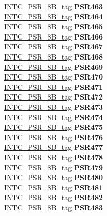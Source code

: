 \begin{DoxyCompactItemize}
\begin{tabbing}
\>\>\mbox{\hyperlink{unionINTC__PSR__8B__tag}{INTC\_PSR\_8B\_tag}} {\bfseries PSR463}\\
\>\>\mbox{\hyperlink{unionINTC__PSR__8B__tag}{INTC\_PSR\_8B\_tag}} {\bfseries PSR464}\\
\>\>\mbox{\hyperlink{unionINTC__PSR__8B__tag}{INTC\_PSR\_8B\_tag}} {\bfseries PSR465}\\
\>\>\mbox{\hyperlink{unionINTC__PSR__8B__tag}{INTC\_PSR\_8B\_tag}} {\bfseries PSR466}\\
\>\>\mbox{\hyperlink{unionINTC__PSR__8B__tag}{INTC\_PSR\_8B\_tag}} {\bfseries PSR467}\\
\>\>\mbox{\hyperlink{unionINTC__PSR__8B__tag}{INTC\_PSR\_8B\_tag}} {\bfseries PSR468}\\
\>\>\mbox{\hyperlink{unionINTC__PSR__8B__tag}{INTC\_PSR\_8B\_tag}} {\bfseries PSR469}\\
\>\>\mbox{\hyperlink{unionINTC__PSR__8B__tag}{INTC\_PSR\_8B\_tag}} {\bfseries PSR470}\\
\>\>\mbox{\hyperlink{unionINTC__PSR__8B__tag}{INTC\_PSR\_8B\_tag}} {\bfseries PSR471}\\
\>\>\mbox{\hyperlink{unionINTC__PSR__8B__tag}{INTC\_PSR\_8B\_tag}} {\bfseries PSR472}\\
\>\>\mbox{\hyperlink{unionINTC__PSR__8B__tag}{INTC\_PSR\_8B\_tag}} {\bfseries PSR473}\\
\>\>\mbox{\hyperlink{unionINTC__PSR__8B__tag}{INTC\_PSR\_8B\_tag}} {\bfseries PSR474}\\
\>\>\mbox{\hyperlink{unionINTC__PSR__8B__tag}{INTC\_PSR\_8B\_tag}} {\bfseries PSR475}\\
\>\>\mbox{\hyperlink{unionINTC__PSR__8B__tag}{INTC\_PSR\_8B\_tag}} {\bfseries PSR476}\\
\>\>\mbox{\hyperlink{unionINTC__PSR__8B__tag}{INTC\_PSR\_8B\_tag}} {\bfseries PSR477}\\
\>\>\mbox{\hyperlink{unionINTC__PSR__8B__tag}{INTC\_PSR\_8B\_tag}} {\bfseries PSR478}\\
\>\>\mbox{\hyperlink{unionINTC__PSR__8B__tag}{INTC\_PSR\_8B\_tag}} {\bfseries PSR479}\\
\>\>\mbox{\hyperlink{unionINTC__PSR__8B__tag}{INTC\_PSR\_8B\_tag}} {\bfseries PSR480}\\
\>\>\mbox{\hyperlink{unionINTC__PSR__8B__tag}{INTC\_PSR\_8B\_tag}} {\bfseries PSR481}\\
\>\>\mbox{\hyperlink{unionINTC__PSR__8B__tag}{INTC\_PSR\_8B\_tag}} {\bfseries PSR482}\\
\>\>\mbox{\hyperlink{unionINTC__PSR__8B__tag}{INTC\_PSR\_8B\_tag}} {\bfseries PSR483}\\

\end{tabbing}
\end{DoxyCompactItemize}

